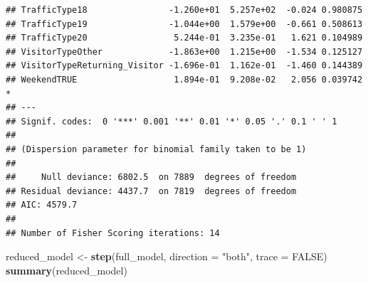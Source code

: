 \documentclass[
]{article}
\newenvironment{Shaded}{\begin{snugshade}}{\end{snugshade}}
\newcommand{\AttributeTok}[1]{\textcolor[rgb]{0.13,0.29,0.53}{#1}}
\newcommand{\ConstantTok}[1]{\textcolor[rgb]{0.56,0.35,0.01}{#1}}
\newcommand{\FunctionTok}[1]{\textcolor[rgb]{0.13,0.29,0.53}{\textbf{#1}}}
\newcommand{\NormalTok}[1]{#1}
\newcommand{\OtherTok}[1]{\textcolor[rgb]{0.56,0.35,0.01}{#1}}
\newcommand{\StringTok}[1]{\textcolor[rgb]{0.31,0.60,0.02}{#1}}
\begin{document}
\begin{verbatim}
## TrafficType18                -1.260e+01  5.257e+02  -0.024 0.980875    
## TrafficType19                -1.044e+00  1.579e+00  -0.661 0.508613    
## TrafficType20                 5.244e-01  3.235e-01   1.621 0.104989    
## VisitorTypeOther             -1.863e+00  1.215e+00  -1.534 0.125127    
## VisitorTypeReturning_Visitor -1.696e-01  1.162e-01  -1.460 0.144389    
## WeekendTRUE                   1.894e-01  9.208e-02   2.056 0.039742 *  
## ---
## Signif. codes:  0 '***' 0.001 '**' 0.01 '*' 0.05 '.' 0.1 ' ' 1
## 
## (Dispersion parameter for binomial family taken to be 1)
## 
##     Null deviance: 6802.5  on 7889  degrees of freedom
## Residual deviance: 4437.7  on 7819  degrees of freedom
## AIC: 4579.7
## 
## Number of Fisher Scoring iterations: 14
\end{verbatim}

\begin{Shaded}
\begin{Highlighting}[]
\NormalTok{reduced\_model }\OtherTok{\textless{}{-}} \FunctionTok{step}\NormalTok{(full\_model, }\AttributeTok{direction =} \StringTok{"both"}\NormalTok{, }\AttributeTok{trace =} \ConstantTok{FALSE}\NormalTok{)}
\FunctionTok{summary}\NormalTok{(reduced\_model)}
\end{Highlighting}
\end{Shaded}
\end{document}
